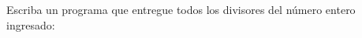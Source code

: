 Escriba un programa que entregue
todos los divisores del número entero ingresado:

\begin{minipage}[t]{.40\textwidth}
  
\end{minipage}
